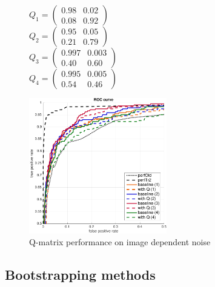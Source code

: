 \documentclass[a4paper]{article}
\begin{document}
            \begin{figure}[H]
            \hspace{80pt}
            \begin{minipage}{.3\textwidth}
                $Q_1=\begin{pmatrix}0.98&0.02\\0.08&0.92\end{pmatrix}$\\
                $Q_2=\begin{pmatrix}0.95&0.05\\0.21&0.79\end{pmatrix}$\\
                $Q_3=\begin{pmatrix}0.997&0.003\\0.40&0.60\end{pmatrix}$\\
                $Q_4=\begin{pmatrix}0.995&0.005\\0.54&0.46\end{pmatrix}$\\
            \end{minipage}
            \begin{minipage}{.7\textwidth}
                \includegraphics[width=6cm]{exp3/iroc_zoom}
            \end{minipage}
            \caption{Q-matrix performance on image dependent noise\label{rocQ}}
            \end{figure}
    \subsection{Bootstrapping methods}\label{sec:bootstrap}
\end{document}
